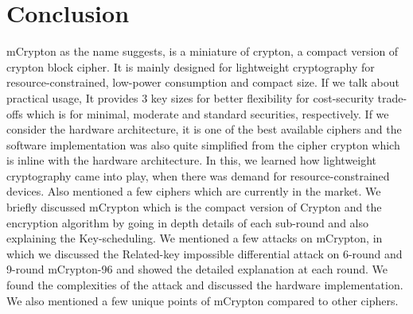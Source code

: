 \documentclass{transcrypto}
\begin{document}
	\section*{Conclusion}
	mCrypton as the name suggests, is a miniature of crypton, a compact version of crypton block cipher. It is mainly designed for lightweight cryptography for resource-constrained, low-power consumption and compact size. If we talk about practical usage, It provides 3 key sizes for better flexibility for cost-security trade-offs which is for minimal, moderate and standard securities, respectively. If we consider the hardware architecture, it is one of the best available ciphers and the software implementation was also quite simplified from the cipher crypton which is inline with the hardware architecture. In this, we learned how lightweight cryptography came into play, when there was demand for resource-constrained devices. Also mentioned a few ciphers which are currently in the market. We briefly discussed mCrypton which is the compact version of Crypton and the encryption algorithm by going in depth details of each sub-round and also explaining the Key-scheduling.  We mentioned a few attacks on mCrypton, in which we discussed the Related-key impossible differential attack on 6-round and 9-round mCrypton-96 and showed the detailed explanation at each round. We found the complexities of the attack and discussed the hardware implementation. We also mentioned a few unique points of mCrypton compared to other ciphers.
	
\end{document}

